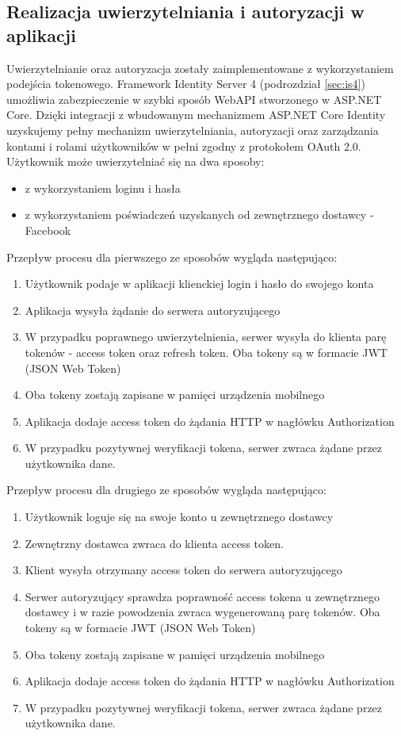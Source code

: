 \subsection*{Realizacja uwierzytelniania i autoryzacji w aplikacji}
\label{autory}
Uwierzytelnianie oraz autoryzacja zostały zaimplementowane z wykorzystaniem podejścia tokenowego. Framework Identity Server 4 (podrozdział \ref{sec:is4}) umożliwia zabezpieczenie w szybki sposób WebAPI stworzonego w ASP.NET Core. Dzięki integracji z wbudowanym mechanizmem ASP.NET Core Identity uzyskujemy pełny mechanizm uwierzytelniania, autoryzacji oraz zarządzania kontami i rolami użytkowników w pełni zgodny z protokołem OAuth 2.0.
\newpage
Użytkownik może uwierzytelniać się na dwa sposoby:
\begin{itemize}
\item z wykorzystaniem loginu i hasła
\item z wykorzystaniem poświadczeń uzyskanych od zewnętrznego dostawcy - Facebook
\end{itemize}

Przepływ procesu dla pierwszego ze sposobów wygląda następująco:
\begin{enumerate}
\item Użytkownik podaje w aplikacji klienckiej login i hasło do swojego konta
\item Aplikacja wysyła żądanie do serwera autoryzującego
\item W przypadku poprawnego uwierzytelnienia, serwer wysyła do klienta parę tokenów - access token oraz refresh token. Oba tokeny są w formacie JWT (JSON Web Token)
\item Oba tokeny zostają zapisane w pamięci urządzenia mobilnego
\item Aplikacja dodaje access token do żądania HTTP w nagłówku Authorization
\item W przypadku pozytywnej weryfikacji tokena, serwer zwraca żądane przez użytkownika dane.
\end{enumerate}
Przepływ procesu dla drugiego ze sposobów wygląda następująco:
\begin{enumerate}
\item Użytkownik loguje się na swoje konto u zewnętrznego dostawcy
\item Zewnętrzny dostawca zwraca do klienta access token.
\item Klient wysyła otrzymany access token do serwera autoryzującego
\item Serwer autoryzujący sprawdza poprawność access tokena u zewnętrznego dostawcy i w razie powodzenia zwraca wygenerowaną parę tokenów. Oba tokeny są w formacie JWT (JSON Web Token)
\item Oba tokeny zostają zapisane w pamięci urządzenia mobilnego
\item Aplikacja dodaje access token do żądania HTTP w nagłówku Authorization
\item W przypadku pozytywnej weryfikacji tokena, serwer zwraca żądane przez użytkownika dane.
\end{enumerate}
